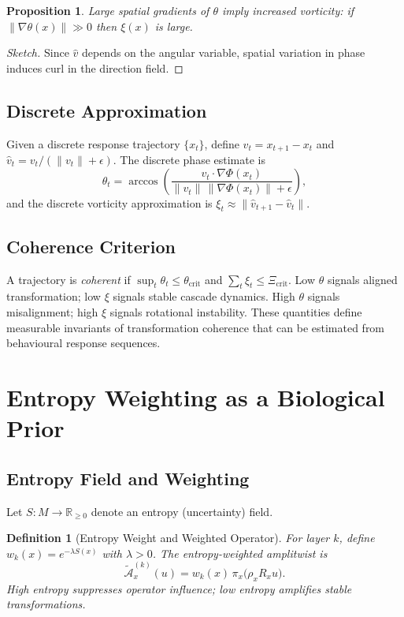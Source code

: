 \documentclass[12pt, a4paper]{article}
\newtheorem{definition}[theorem]{Definition}
\newtheorem{proposition}[theorem]{Proposition}
\theoremstyle{remark}
\theoremstyle{definition}
\begin{document}
\begin{proposition}
Large spatial gradients of $\theta$ imply increased vorticity: if
$\|\nabla\theta(x)\| \gg 0$ then $\xi(x)$ is large.
\end{proposition}

\begin{proof}[Sketch]
Since $\hat{v}$ depends on the angular variable, spatial variation in phase induces curl in
the direction field.
\end{proof}

\subsection{Discrete Approximation}

Given a discrete response trajectory $\{x_t\}$, define $v_t = x_{t+1} - x_t$ and
$\hat{v}_t = v_t/(\|v_t\|+\epsilon)$.  The discrete phase estimate is
\[
\theta_t = \arccos\!\left(
\frac{v_t \cdot \nabla\Phi(x_t)}{\|v_t\|\,\|\nabla\Phi(x_t)\|+\epsilon}
\right),
\]
and the discrete vorticity approximation is
$\xi_t \approx \|\hat{v}_{t+1} - \hat{v}_t\|$.

\subsection{Coherence Criterion}

A trajectory is \emph{coherent} if $\sup_t \theta_t \le \theta_{\mathrm{crit}}$ and
$\sum_t \xi_t \le \Xi_{\mathrm{crit}}$.  Low $\theta$ signals aligned transformation; low
$\xi$ signals stable cascade dynamics.  High $\theta$ signals misalignment; high $\xi$
signals rotational instability.  These quantities define measurable invariants of
transformation coherence that can be estimated from behavioural response sequences.

\section{Entropy Weighting as a Biological Prior}
\label{app:entropy}

\subsection{Entropy Field and Weighting}

Let $S \colon M \to \mathbb{R}_{\ge 0}$ denote an entropy (uncertainty) field.

\begin{definition}[Entropy Weight and Weighted Operator]
For layer $k$, define $w_k(x) = e^{-\lambda S(x)}$ with $\lambda > 0$.  The
entropy-weighted amplitwist is
\[
\widetilde{\mathcal{A}}^{(k)}_x(u)
= w_k(x)\,\pi_x\!\bigl(\rho_x R_x u\bigr).
\]
High entropy suppresses operator influence; low entropy amplifies stable transformations.
\end{definition}
\end{document}
